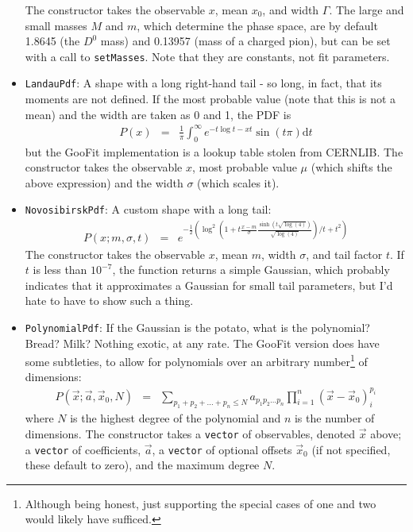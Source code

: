\documentclass[12pt,pdflatex]{article}
\begin{document}
\begin{itemize}
The constructor takes the observable $x$, mean $x_0$, and width $\Gamma$. The
large and small masses $M$ and $m$, which determine the phase space, are by default
1.8645 (the $D^0$ mass) and 0.13957 (mass of a charged pion), but can be set with
a call to \texttt{setMasses}. Note that they are constants, not fit parameters. 
\item \texttt{LandauPdf}: A shape with a long right-hand tail - so long, in
fact, that its moments are not defined. If the most probable value (note that this is not
a mean) and the width are taken as 0 and 1, the PDF is
\begin{eqnarray}
P(x) &=& \frac{1}{\pi}\int_0^\infty e^{-t\log t - xt}\sin(t\pi)\mathrm{d}t
\end{eqnarray}
but the GooFit implementation
is a lookup table stolen from CERNLIB. 
The constructor takes the observable $x$, most probable value $\mu$
(which shifts the above expression) and the width $\sigma$ (which scales it). 
\item \texttt{NovosibirskPdf}: A custom shape with a long tail:
\begin{eqnarray}
P(x;m,\sigma,t) &=& 
e^{-\frac{1}{2}\left(\log^2(1+t\frac{x-m}{\sigma}\frac{\sinh(t\sqrt{\log(4)})}{\sqrt{\log(4)}})/t + t^2\right)}
\end{eqnarray}
The constructor takes the observable $x$, mean $m$, width $\sigma$, 
and tail factor $t$. If $t$ is less than $10^{-7}$, the function
returns a simple Gaussian, which probably indicates that it approximates
a Gaussian for small tail parameters, but I'd hate to have to show such
a thing. 
\item \texttt{PolynomialPdf}: If the Gaussian is the potato,
what is the polynomial? Bread? Milk? Nothing exotic, at any rate. 
The GooFit version does have some subtleties, to allow for polynomials
over an arbitrary number\footnote{Although being honest,
just supporting the special cases of one and two would likely have sufficed.}
 of dimensions:
\begin{eqnarray}
P(\vec x; \vec a, \vec x_0, N) &=&
\sum\limits_{p_1+p_2+\ldots+p_n \le N} a_{p_1p_2\ldots p_n} \prod\limits_{i=1}^n (\vec x - \vec x_0)_i^{p_i}
\end{eqnarray}
where $N$ is the highest degree of the polynomial and $n$ is the number of dimensions.
The constructor takes a \texttt{vector} of observables, denoted $\vec x$ above;
a \texttt{vector} of coefficients, $\vec a$, a \texttt{vector} of optional offsets $\vec x_0$
(if not specified, these default to zero), and the maximum degree $N$. 

\end{itemize}
\end{document}

